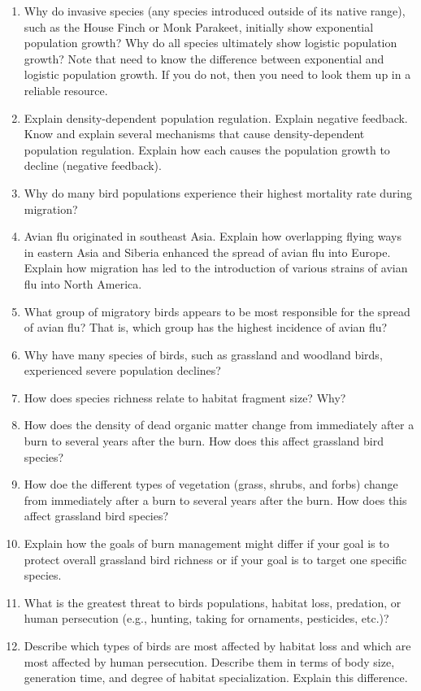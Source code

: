 \documentclass[nofonts, letterpaper]{tufte-handout}
\begin{document}
\begin{enumerate}

\item Why do invasive species (any species introduced outside of its native range), such as the House Finch or Monk Parakeet, initially show exponential population growth?  Why do all species ultimately show logistic population growth?  Note that need to know the difference between exponential and logistic population growth. If you do not, then you need to look them up in a reliable resource.

\item Explain density-dependent population regulation. Explain negative feedback. Know and explain several mechanisms that cause density-dependent population regulation. Explain how each causes the population growth to decline (negative feedback).

\item Why do many bird populations experience their highest mortality rate during migration?

\item Avian flu originated in southeast Asia. Explain how overlapping flying ways in eastern Asia and Siberia enhanced the spread of avian flu into Europe. Explain how migration has led to the introduction of various strains of avian flu into North America.

\item What group of migratory birds appears to be most responsible for the spread of avian flu?  That is, which group has the highest incidence of avian flu?

\item Why have many species of birds, such as grassland and woodland birds, experienced severe population declines?

\item How does species richness relate to habitat fragment size?  Why?

\item How does the density of dead organic matter change from immediately after a burn to several years after the burn. How does this affect grassland bird species?

\item How doe the different types of vegetation (grass, shrubs, and forbs) change from immediately after a burn to several years after the burn. How does this affect grassland bird species?

\item Explain how the goals of burn management might differ if your goal is to protect overall grassland bird richness or if your goal is to target one specific species.

\item What is the greatest threat to birds populations, habitat loss, predation, or human persecution (e.g., hunting, taking for ornaments, pesticides, etc.)?

\item Describe which types of birds are most affected by habitat loss and which are most affected by human persecution. Describe them in terms of body size, generation time, and degree of habitat specialization. Explain this difference.

\end{enumerate}
\end{document}
